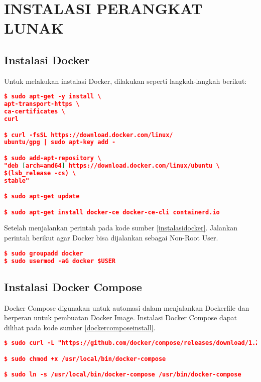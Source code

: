 \chapter{INSTALASI PERANGKAT LUNAK}

\section*{Instalasi Docker}
	Untuk melakukan instalasi Docker, dilakukan seperti langkah-langkah berikut:
\begin{lstlisting}[frame=single,tabsize=2,breaklines,caption={Perintah instalasi Docker },label=instalasidocker, captionpos=b, language=json,numbers=none]
$ sudo apt-get -y install \
apt-transport-https \
ca-certificates \
curl

$ curl -fsSL https://download.docker.com/linux/
ubuntu/gpg | sudo apt-key add -

$ sudo add-apt-repository \
"deb [arch=amd64] https://download.docker.com/linux/ubuntu \
$(lsb_release -cs) \
stable"

$ sudo apt-get update

$ sudo apt-get install docker-ce docker-ce-cli containerd.io
\end{lstlisting}
	
	Setelah menjalankan perintah pada kode sumber \ref{instalasidocker}. Jalankan perintah berikut agar Docker bisa dijalankan sebagai Non-Root User.
\begin{lstlisting}[frame=single,tabsize=2,breaklines,caption={Perintah mengubah hak User },label=nonrootuser, captionpos=b, language=json,numbers=none]
$ sudo groupadd docker
$ sudo usermod -aG docker $USER
\end{lstlisting}

\section*{Instalasi Docker Compose}
Docker Compose digunakan untuk automasi dalam menjalankan Dockerfile dan berperan untuk pembuatan Docker Image. Instalasi Docker Compose dapat dilihat pada kode sumber \ref{dockercomposeinstall}.

\begin{lstlisting}[frame=single,tabsize=2,breaklines,caption={Perintah instalasi Docker Compose},label=dockercomposeinstall, captionpos=b, language=json,numbers=none]
$ sudo curl -L "https://github.com/docker/compose/releases/download/1.24.0/docker-compose-$(uname -s)-$(uname -m)" -o /usr/local/bin/docker-compose

$ sudo chmod +x /usr/local/bin/docker-compose

$ sudo ln -s /usr/local/bin/docker-compose /usr/bin/docker-compose
\end{lstlisting}


